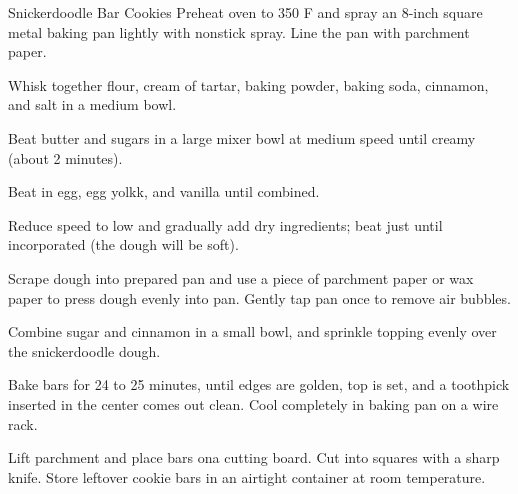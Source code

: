 \documentclass[letterpaper]{book}
\begin{document}
\begin{recipe}{Snickerdoodle Bar Cookies}{}{}
    \newstep
    Preheat oven to 350\0 F and spray an 8-inch square metal baking pan lightly with nonstick spray.
    Line the pan with parchment paper.

    Whisk together flour, cream of tartar, baking powder, baking soda, cinnamon, and salt in a medium bowl.

    Beat butter and sugars in a large mixer bowl at medium speed until creamy (about 2 minutes).

    Beat in egg, egg yolkk, and vanilla until combined.

    \newstep
    Reduce speed to low and gradually add dry ingredients; beat just until incorporated (the dough will be soft).

    \newstep
    Scrape dough into prepared pan and use a piece of parchment paper or wax paper to press dough evenly into pan.
    Gently tap pan once to remove air bubbles.

    Combine sugar and cinnamon in a small bowl, and sprinkle topping evenly over the snickerdoodle dough.

    \newstep
    Bake bars for 24 to 25 minutes, until edges are golden, top is set, and a toothpick inserted in the center comes out clean. Cool completely in baking pan on a wire rack.

    Lift parchment and place bars ona cutting board.
    Cut into squares with a sharp knife.
    Store leftover cookie bars in an airtight container at room temperature.
\end{recipe}
\end{document}
